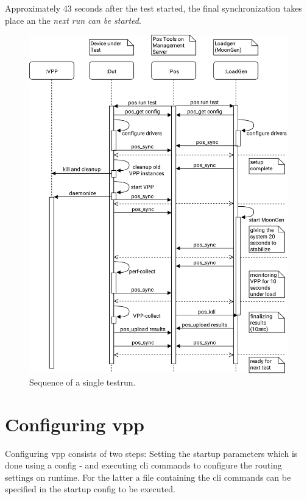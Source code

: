 Approximately 43 seconds after the test started, the final
synchronization takes place an the \textit{next run can be started}.

\begin{figure}[!ht]
\noindent\hspace{0.5mm}\includegraphics[width=\linewidth]{pics/procedure-sequence.png}
\caption{Sequence of a single testrun. }
\label{testsequence}
\end{figure}


\section{Configuring \Ac{vpp}}


Configuring \Ac{vpp} consists of two steps: Setting the startup
parameters which is done using a \Ac{config} - and executing \Ac{cli}
commands to configure the routing settings on runtime. For the latter
a file containing the \Ac{cli} commands can be specified in the
startup \Ac{config} to be executed. 

